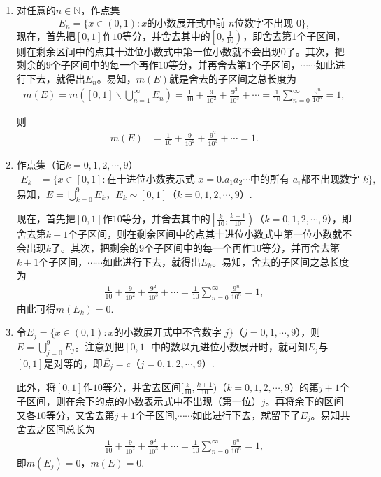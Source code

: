 \documentclass[../../main.tex]{subfiles}%
\begin{document}
\begin{solution}
\begin{enumerate}[(1)]
\item 对任意的$n\in\mathbb{N}$，作点集
\[
E_n = \{x\in(0,1): x\text{的小数展开式中前 }n\text{位数字不出现 }0\},
\]
现在，首先把$[0,1]$作$10$等分，并舍去其中的$\left[0,\frac{1}{10}\right)$，即舍去第$1$个子区间，则在剩余区间中的点其十进位小数式中第一位小数就不会出现$0$了。其次，把剩余的$9$个子区间中的每一个再作$10$等分，并再舍去第$1$个子区间，$\cdots\cdots$如此进行下去，就得出$E_n$。易知，$m(E)$就是舍去的子区间之总长度为
\begin{align*}
m\left( E \right) =m\left( \left[ 0,1 \right] \backslash \bigcup_{n=1}^{\infty}{E_n} \right) =\frac{1}{10}+\frac{9}{10^2}+\frac{9^2}{10^3}+\cdots =\frac{1}{10}\sum_{n=0}^{\infty}{\frac{9^n}{10^n}}=1,
\end{align*}

则
\begin{align*}
m(E) &= \frac{1}{10} + \frac{9}{10^2} + \frac{9^2}{10^3} + \cdots = 1.
\end{align*}

\item 作点集（记$k=0,1,2,\cdots,9$）
\begin{align*}
E_k &= \{x\in[0,1]: \text{在十进位小数表示式 }x=0.a_1a_2\cdots\text{中的所有 }a_i\text{都不出现数字 }k\},
\end{align*}
易知，$E=\bigcup\limits_{k=0}^{9}E_k$，$E_k\sim[0,1]$（$k=0,1,2,\cdots,9$）.

现在，首先把$[0,1]$作$10$等分，并舍去其中的$\left[\frac{k}{10},\frac{k+1}{10}\right)$（$k=0,1,2,\cdots,9$），即舍去第$k+1$个子区间，则在剩余区间中的点其十进位小数式中第一位小数就不会出现$k$了。其次，把剩余的$9$个子区间中的每一个再作$10$等分，并再舍去第$k+1$个子区间，$\cdots\cdots$如此进行下去，就得出$E_k$。易知，舍去的子区间之总长度为
\begin{align*}
\frac{1}{10}+\frac{9}{10^2}+\frac{9^2}{10^3}+\cdots =\frac{1}{10}\sum_{n=0}^{\infty}{\frac{9^n}{10^n}}=1,
\end{align*}
由此可得$m(E_k)=0$.

\item 令$E_j=\{x\in(0,1): x\text{的小数展开式中不含数字 }j\}$（$j=0,1,\cdots,9$），则$E=\bigcup\limits_{j=0}^{9}E_j$。注意到把$[0,1]$中的数以九进位小数展开时，就可知$E_j$与$[0,1]$是对等的，即$\overline{E_j}=c$（$j=0,1,2,\cdots,9$）.

此外，将$[0,1]$作$10$等分，并舍去区间$[\frac{k}{10},\frac{k+1}{10})$（$k=0,1,2,\cdots,9$）的第$j+1$个子区间，则在余下的点的小数表示式中不出现（第一位）$j$。再将余下的区间又各$10$等分，又舍去第$j+1$个子区间,$\cdots\cdots$如此进行下去，就留下了$E_j$。易知共舍去之区间总长为
\begin{align*}
\frac{1}{10}+\frac{9}{10^2}+\frac{9^2}{10^3}+\cdots =\frac{1}{10}\sum_{n=0}^{\infty}{\frac{9^n}{10^n}}=1,
\end{align*}
即$m(E_j)=0$，$m(E)=0$.


\end{enumerate}
\end{solution}
\end{document}
